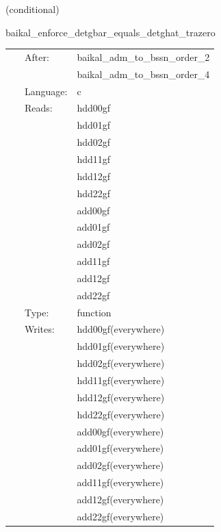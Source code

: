 \vspace{5mm}

   (conditional) 

\hspace{5mm} baikal\_enforce\_detgbar\_equals\_detghat\_trazero 

\hspace{5mm}{\it project freshly initialized or restored bssn/fccz4 state } 


\hspace{5mm}

 \begin{tabular*}{160mm}{cll} 
~ & After:  & baikal\_adm\_to\_bssn\_order\_2 \\ 
~& ~ &baikal\_adm\_to\_bssn\_order\_4\\ 
~ & Language:  & c \\ 
~ & Reads:  & hdd00gf \\ 
~& ~ &hdd01gf\\ 
~& ~ &hdd02gf\\ 
~& ~ &hdd11gf\\ 
~& ~ &hdd12gf\\ 
~& ~ &hdd22gf\\ 
~& ~ &add00gf\\ 
~& ~ &add01gf\\ 
~& ~ &add02gf\\ 
~& ~ &add11gf\\ 
~& ~ &add12gf\\ 
~& ~ &add22gf\\ 
~ & Type:  & function \\ 
~ & Writes:  & hdd00gf(everywhere) \\ 
~& ~ &hdd01gf(everywhere)\\ 
~& ~ &hdd02gf(everywhere)\\ 
~& ~ &hdd11gf(everywhere)\\ 
~& ~ &hdd12gf(everywhere)\\ 
~& ~ &hdd22gf(everywhere)\\ 
~& ~ &add00gf(everywhere)\\ 
~& ~ &add01gf(everywhere)\\ 
~& ~ &add02gf(everywhere)\\ 
~& ~ &add11gf(everywhere)\\ 
~& ~ &add12gf(everywhere)\\ 
~& ~ &add22gf(everywhere)\\ 
\end{tabular*} 


\vspace{5mm}


